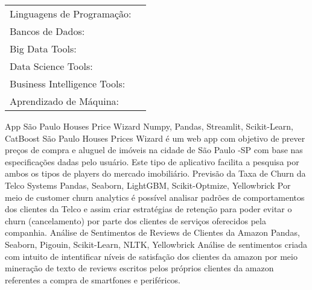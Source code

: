 \documentclass[11pt, letter]{awesome-cv}
\begin{document}
\vspace{-3mm}
\vspace{-3mm}
\begin{cventries}
	\vspace{-2mm}
	\cventry
	{}
	{\def\arraystretch{1.15}{\begin{tabular}{ l l }
				Linguagens de Programação:  & {\skill{ Python, R, SQL}} \\
				Bancos de Dados:  & {\skill{ MySQL, SQLServer, PostgreeSQL}} \\
				Big Data Tools:  & {\skill{ Apache Spark, Pyspark, Google BigQuery, Microsoft Azure Machine Learning}} \\
				Data Science Tools:  & {\skill{ Numpy, Pandas, Matplotlib, Seaborn, Plotly, Scikit-Learn, XGBoost, LightGBM}} \\
				Business Intelligence Tools:  & {\skill{ Microsoft Power BI, QlikView, Google Data Studio}} \\
				Aprendizado de Máquina:  & {\skill{ Mineração de Dados, Regressão, Classificação, Clusterização, Series Temporais}} \\
	\end{tabular}}}
	{}
	{}
	{}
\end{cventries}
\vspace{-14mm}
\begin{cventries}
  \cventry
    {}
    	{App São Paulo Houses Price Wizard\vspace{-4mm}}
    	{Numpy, Pandas, Streamlit, Scikit-Learn, CatBoost\vspace{-8mm}}
	{\vspace{4mm}}
	{São Paulo Houses Prices Wizard é um web app com objetivo de prever preços de compra e aluguel de imóveis na cidade de São Paulo -SP com base nas especificações dadas pelo usuário. Este tipo de aplicativo facilita a pesquisa por ambos os tipos de players do mercado imobiliário.}
  \cventry
    {}
	{Previsão da Taxa de Churn da Telco Systems\vspace{-4mm}}
	{Pandas, Seaborn, LightGBM, Scikit-Optmize,  Yellowbrick\vspace{-8mm}}
	{\vspace{4mm}}
	{Por meio de customer churn analytics é possível analisar padrões de comportamentos dos clientes da Telco e assim criar estratégias de retenção para poder evitar o churn (cancelamento) por parte dos clientes de serviços oferecidos pela companhia. }
  \cventry
    {}
	{Análise de Sentimentos de Reviews de Clientes da Amazon\vspace{-4mm}}
	{Pandas, Seaborn, Pigouin, Scikit-Learn, NLTK, Yellowbrick\vspace{-8mm}}
	{\vspace{4mm}}
	{Análise de sentimentos criada com intuito de intentificar níveis de satisfação dos clientes da amazon por meio mineração de texto de reviews escritos pelos próprios clientes da amazon referentes a compra de smartfones e periféricos. }
	
\end{cventries}
\end{document}
